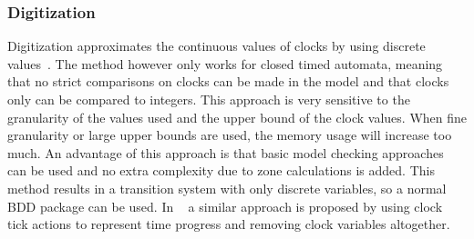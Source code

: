 \subsubsection{Digitization}
Digitization approximates the continuous values of clocks by using discrete values~\cite{CHARME01}. The method however only works for closed timed automata, meaning that no strict comparisons on clocks can be made in the model and that clocks only can be compared to integers. This approach is very sensitive to the granularity of the values used and the upper bound of the clock values. When fine granularity or large upper bounds are used, the memory usage will increase too much. An advantage of this approach is that basic model checking approaches can be used and no extra complexity due to zone calculations is added. This method results in a transition system with only discrete variables, so a normal BDD package can be used. In ~\cite{nguyen2012discrete} a similar approach is proposed by using clock tick actions to represent time progress and removing clock variables altogether.

